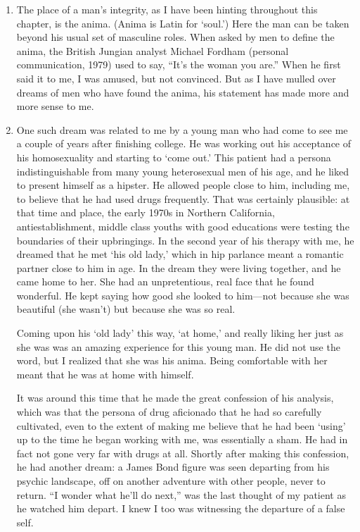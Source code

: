 \begin{enumerate}

\item {} The place of a man’s integrity, as I have been
hinting throughout this chapter, is the anima. (Anima is Latin for ‘soul.’)
Here the man can be taken beyond his usual set of masculine roles. When asked
by men to define the anima, the British Jungian analyst Michael Fordham
(personal communication, 1979) used to say, “It’s the woman you are.” When he
first said it to me, I was amused, but not convinced. But as I have mulled over
dreams of men who have found the anima, his statement has made more and more
sense to me.

\item {} One such dream was related to
me by a young man who had come to see me a couple of years after finishing
college. He was working out his acceptance of his homosexuality and starting to
‘come out.’ This patient had a persona indistinguishable from many young
heterosexual men of his age, and he liked to present himself as a hipster. He
allowed people close to him, including me, to believe that he had used drugs
frequently. That was certainly plausible: at that time and place, the early
1970s in Northern California, antiestablishment, middle class youths with good
educations were testing the boundaries of their upbringings. In the second year
of his therapy with me, he dreamed that he met ‘his old lady,’ which in hip
parlance meant a romantic partner close to him in age. In the dream they were
living together, and he came home to her. She had an unpretentious, real face
that he found wonderful. He kept saying how good she looked to him—not because
she was beautiful (she wasn’t) but because she was so real.

Coming upon his ‘old lady’ this way, ‘at home,’ and really liking her just as
she was was an amazing experience for this young man. He did not use the word,
but I realized that she was his anima. Being comfortable with her meant that he
was at home with himself.

It was around this time that he made the great confession of his analysis,
which was that the persona of drug aficionado that he had so carefully
cultivated, even to the extent of making me believe that he had been ‘using’ up
to the time he began working with me, was essentially a sham. He had in fact
not gone very far with drugs at all. Shortly after making this confession, he
had another dream: a James Bond figure was seen departing from his psychic
landscape, off on another adventure with other people, never to return. “I
wonder what he’ll do next,” was the last thought of my patient as he watched
him depart. I knew I too was witnessing the departure of a false self.


\end{enumerate}
